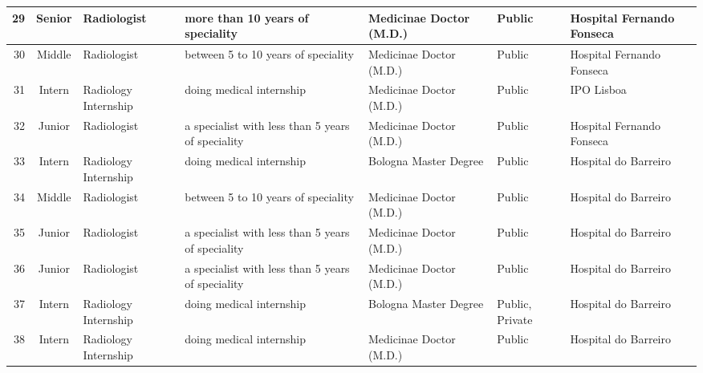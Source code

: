 \begin{landscape}
\begin{table}[htbp]
{\begin{tabular}{|r|c|l|l|l|l|l|}
29          & Senior         & Radiologist                      & more than 10 years of speciality                      & Medicinae Doctor (M.D.)                       & Public               & Hospital Fernando Fonseca \\ \hline
30          & Middle         & Radiologist                      & between 5 to 10 years of speciality                   & Medicinae Doctor (M.D.)                       & Public               & Hospital Fernando Fonseca \\ \hline
31          & Intern         & Radiology Internship             & doing medical internship                              & Medicinae Doctor (M.D.)                       & Public               & IPO Lisboa                \\ \hline
32          & Junior         & Radiologist                      & a specialist with less than 5 years of speciality     & Medicinae Doctor (M.D.)                       & Public               & Hospital Fernando Fonseca \\ \hline
33          & Intern         & Radiology Internship             & doing medical internship                              & Bologna Master Degree                         & Public               & Hospital do Barreiro      \\ \hline
34          & Middle         & Radiologist                      & between 5 to 10 years of speciality                   & Medicinae Doctor (M.D.)                       & Public               & Hospital do Barreiro      \\ \hline
35          & Junior         & Radiologist                      & a specialist with less than 5 years of speciality     & Medicinae Doctor (M.D.)                       & Public               & Hospital do Barreiro      \\ \hline
36          & Junior         & Radiologist                      & a specialist with less than 5 years of speciality     & Medicinae Doctor (M.D.)                       & Public               & Hospital do Barreiro      \\ \hline
37          & Intern         & Radiology Internship             & doing medical internship                              & Bologna Master Degree                         & Public, Private      & Hospital do Barreiro      \\ \hline
38          & Intern         & Radiology Internship             & doing medical internship                              & Medicinae Doctor (M.D.)                       & Public               & Hospital do Barreiro      \\ \hline

\end{tabular}}
\end{table}
\end{landscape}
